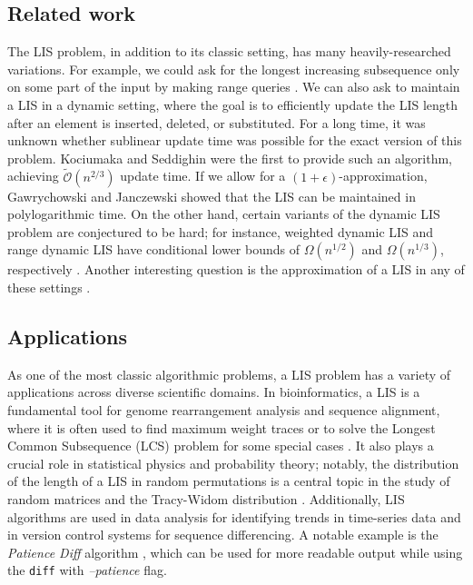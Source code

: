 \documentclass[lic, english, shortabstract]{iithesis}
\theoremstyle{plain}
\theoremstyle{definition}
\begin{document}
\subsection{Related work}
The LIS problem, in addition to its classic setting, has many heavily-researched variations.
For example, we could ask for the longest increasing subsequence only on some part of the input by making range queries \cite{range-lis}.
We can also ask to maintain a LIS in a dynamic setting, where the goal is to efficiently update the LIS length after an element is inserted, deleted, or substituted. 
For a long time, it was unknown whether sublinear update time was possible for the exact version of this problem. 
Kociumaka and Seddighin \cite{dynamic-lis} were the first to provide such an algorithm, achieving $\tilde{\mathcal{O}}(n^{2/3})$ update time. 
If we allow for a $(1+\epsilon)$-approximation, Gawrychowski and Janczewski \cite{approx-lis} showed that the LIS can be maintained in polylogarithmic time.
On the other hand, certain variants of the dynamic LIS problem are conjectured to be hard; for instance, weighted dynamic LIS and range dynamic LIS have conditional lower bounds of $\Omega(n^{1/2})$ and $\Omega(n^{1/3})$, respectively \cite{dynamic-lis-lb}.
Another interesting question is the approximation of a LIS in any of these settings \cite{approx-lis, approx-lcs}. 

\subsection{Applications}
As one of the most classic algorithmic problems, a LIS problem has a variety of applications across diverse scientific domains.
In bioinformatics, a LIS is a fundamental tool for genome rearrangement analysis and sequence alignment, where it is often used to find maximum weight traces or to solve the Longest Common Subsequence (LCS) problem for some special cases \cite{delcher1999alignment}. 
It also plays a crucial role in statistical physics and probability theory; notably, the distribution of the length of a LIS in random permutations is a central topic in the study of random matrices and the Tracy-Widom distribution \cite{baik1999distribution}. 
Additionally, LIS algorithms are used in data analysis for identifying trends in time-series data and in version control systems for sequence differencing.
A notable example is the \textit{Patience Diff} algorithm \cite{patience-diff}, which can be used for more readable output while using the \texttt{diff} with \textit{--patience} flag.
\end{document}

